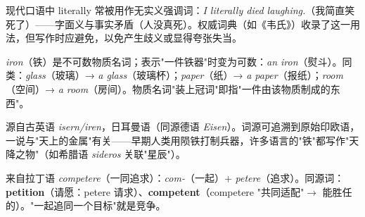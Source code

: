 \documentclass[../main.tex]{subfiles}
\begin{document}
\begin{gram}
现代口语中 literally 常被用作无实义强调词：\textit{I literally died laughing.}（我简直笑死了）——字面义与事实矛盾（人没真死）。权威词典（如《韦氏》）收录了这一用法，但写作时应避免，以免产生歧义或显得夸张失当。
\end{gram}





\begin{gram}[物质名词的具体化]
\textit{iron}（铁）是不可数物质名词；表示"一件铁器"时变为可数：\textit{an iron}（熨斗）。同类：\textit{glass}（玻璃）→ \textit{a glass}（玻璃杯）；\textit{paper}（纸）→ \textit{a paper}（报纸）；\textit{room}（空间）→ \textit{a room}（房间）。物质名词"装上冠词"即指"一件由该物质制成的东西"。
\end{gram}

\begin{origin}
源自古英语 \textit{isern/iren}，日耳曼语（同源德语 \textit{Eisen}）。词源可追溯到原始印欧语，一说与"天上的金属"有关——早期人类用陨铁打制兵器，许多语言的"铁"都写作"天降之物"（如希腊语 \textit{sideros} 关联"星辰"）。
\end{origin}





\begin{origin}
来自拉丁语 \textit{competere}（一同追求）：\textit{com-}（一起）+ \textit{petere}（追求）。同源词：\textbf{petition}（请愿：petere 请求）、\textbf{competent}（competere "共同适配"$\to$ 能胜任的）。"一起追同一个目标"就是竞争。
\end{origin}
\end{document}
